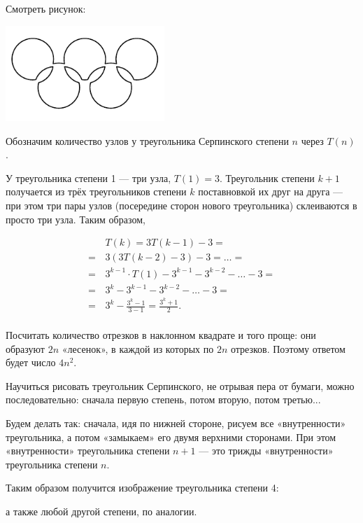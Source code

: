 
\begin{itemize}
\itA Смотреть рисунок:

\begin{center}
	\includegraphics[natwidth=3309,natheight=1272,width=6cm]{figures/2018-serpinsky-a}
\end{center}

\itB Обозначим количество узлов у треугольника Серпинского степени $n$ через $T(n)$.

У треугольника степени 1 — три узла, $T(1)=3$. Треугольник степени $k+1$ получается из  трёх треугольников степени $k$ поставновкой их друг на друга — при этом три пары узлов (посередине сторон нового треугольника) склеиваются в просто три узла. Таким образом,

\begin{align*}
	& T(k) = 3T(k-1) - 3 =\\
	=\, & 3(3T(k-2)-3)-3 = \ldots = \\
	=\, & 3^{k-1}\cdot T(1) - 3^{k-1} - 3^{k-2} - \ldots - 3 = \\
	=\, & 3^k - 3^{k-1} - 3^{k-2} - \ldots - 3 = \\
	=\, & 3^k - \frac{3^k-1}{3-1} = \frac{3^k+1}{2}. \\
\end{align*}

\vspace{-0.4cm}
Посчитать количество отрезков в наклонном квадрате и того проще: они образуют $2n$ «лесенок», в каждой из которых по $2n$ отрезков. Поэтому ответом будет число $4n^2$.

\itC Научиться рисовать треугольник Серпинского, не отрывая пера от бумаги, можно последовательно: сначала первую степень, потом вторую, потом третью...

Будем делать так: сначала, идя по нижней стороне, рисуем все «внутренности» треугольника, а потом «замыкаем» его двумя верхними сторонами. 
При этом «внутренности» треугольника степени $n+1$ — это трижды «внутренности» треугольника степени $n$.

Таким образом получится изображение треугольника степени 4:

\begin{center}
\end{center}

а также любой другой степени, по аналогии.
\end{itemize}